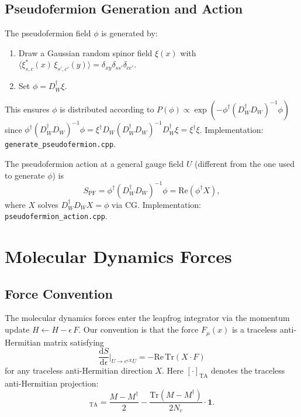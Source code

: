 \documentclass[12pt]{article}
\newcommand{\dd}{\mathrm{d}}
\newcommand{\Tr}{\mathrm{Tr}}
\newcommand{\ReTr}{\mathrm{Re\,Tr}}
\newcommand{\code}[1]{\texttt{#1}}
\begin{document}
\subsection{Pseudofermion Generation and Action}

The pseudofermion field $\phi$ is generated by:
\begin{enumerate}
\item Draw a Gaussian random spinor field $\xi(x)$ with $\langle \xi^*_{s,c}(x) \, \xi_{s',c'}(y) \rangle = \delta_{xy} \delta_{ss'} \delta_{cc'}$.
\item Set $\phi = D_W^\dagger \xi$.
\end{enumerate}
This ensures $\phi$ is distributed according to $P(\phi) \propto \exp(-\phi^\dagger (D_W^\dagger D_W)^{-1} \phi)$ since $\phi^\dagger (D_W^\dagger D_W)^{-1} \phi = \xi^\dagger D_W (D_W^\dagger D_W)^{-1} D_W^\dagger \xi = \xi^\dagger \xi$. Implementation: \code{generate\_pseudofermion.cpp}.

The pseudofermion action at a general gauge field $U$ (different from the one used to generate $\phi$) is
\begin{equation}
\label{eq:spf}
S_{\mathrm{PF}} = \phi^\dagger (D_W^\dagger D_W)^{-1} \phi = \mathrm{Re}(\phi^\dagger X),
\end{equation}
where $X$ solves $D_W^\dagger D_W X = \phi$ via CG. Implementation: \code{pseudofermion\_action.cpp}.


\section{Molecular Dynamics Forces}
\label{sec:forces}

\subsection{Force Convention}

The molecular dynamics forces enter the leapfrog integrator via the momentum update $H \gets H - \epsilon \, F$. Our convention is that the force $F_\mu(x)$ is a traceless anti-Hermitian matrix satisfying
\begin{equation}
\label{eq:force_convention}
\frac{\dd S}{\dd\epsilon}\bigg|_{U \to e^{\epsilon X} U} = -\ReTr(X \cdot F)
\end{equation}
for any traceless anti-Hermitian direction $X$. Here $[\cdot]_{\mathrm{TA}}$ denotes the traceless anti-Hermitian projection:
\begin{equation}
[M]_{\mathrm{TA}} = \frac{M - M^\dagger}{2} - \frac{\Tr(M - M^\dagger)}{2 N_c} \cdot \mathbf{1}.
\end{equation}
\end{document}
